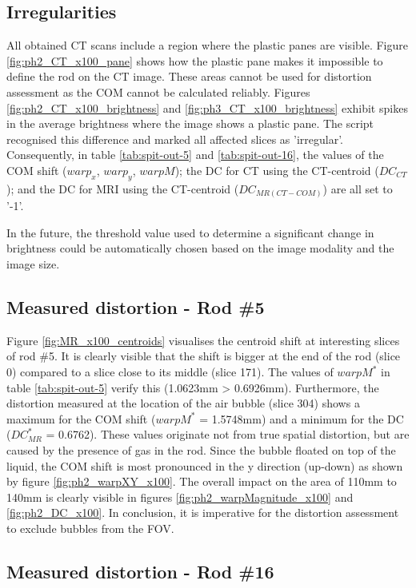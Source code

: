 \subsection{Irregularities}
All obtained CT scans include a region where the plastic panes are visible.
Figure \ref{fig:ph2_CT_x100_pane} shows how the plastic pane makes it impossible to define the rod on the CT image.
These areas cannot be used for distortion assessment as the COM cannot be calculated reliably.
Figures \ref{fig:ph2_CT_x100_brightness} and \ref{fig:ph3_CT_x100_brightness} exhibit spikes in the average brightness where the image shows a plastic pane.
The script recognised this difference and marked all affected slices as 'irregular'.
Consequently, in table \ref{tab:spit-out-5} and \ref{tab:spit-out-16}, the values of the COM shift ($warp_x$, $warp_y$, $warpM$); the DC for CT using the CT-centroid ($DC_{CT}$); and the DC for MRI using the CT-centroid ($DC_{MR(CT-COM)}$) are all set to '-1'.

In the future, the threshold value used to determine a significant change in brightness could be automatically chosen based on the image modality and the image size.

\subsection{Measured distortion - Rod \#5}

Figure \ref{fig:MR_x100_centroids} visualises the centroid shift at interesting slices of rod \#5.
It is clearly visible that the shift is bigger at the end of the rod (slice 0) compared to a slice close to its middle (slice 171).
The values of $warpM^*$ in table \ref{tab:spit-out-5} verify this (1.0623mm > 0.6926mm).
Furthermore, the distortion measured at the location of the air bubble (slice 304) shows a maximum for the COM shift ($warpM^*$ = 1.5748mm) and a minimum for the DC ($DC^*_{MR}$ = 0.6762).
These values originate not from true spatial distortion, but are caused by the presence of gas in the rod.
Since the bubble floated on top of the liquid, the COM shift is most pronounced in the y direction (up-down) as shown by figure \ref{fig:ph2_warpXY_x100}.
The overall impact on the area of 110mm to 140mm is clearly visible in figures \ref{fig:ph2_warpMagnitude_x100} and \ref{fig:ph2_DC_x100}.
In conclusion, it is imperative for the distortion assessment to exclude bubbles from the FOV.

\subsection{Measured distortion - Rod \#16}

